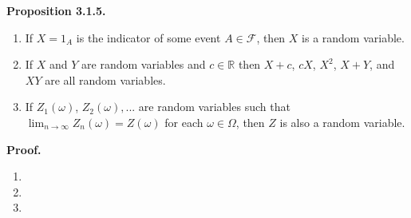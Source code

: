 \documentclass{article}
\begin{document}
\medskip

\noindent \textbf{Proposition 3.1.5.} 

\begin{enumerate}[i] 

\item If $X = 1_A$ is the indicator of some event $A \in \mathcal{F}$, then $X$ is a random variable.

\item If $X$ and $Y$ are random variables and $c \in \mathbb{R}$ then $X + c$, $cX$, $X^2$, $X+Y$, and $XY$ are all random variables.

\item If $Z_1(\omega)$, $Z_2(\omega),...$ are random variables such that $\lim_{n \to \infty} Z_n(\omega)  = Z(\omega)$ for each $\omega \in \Omega$, then $Z$ is also a random variable. 

\end{enumerate}  


\medskip

\noindent \textbf{Proof.} \begin{enumerate}

\item 

\item 

\item 

\end{enumerate}
\end{document}
